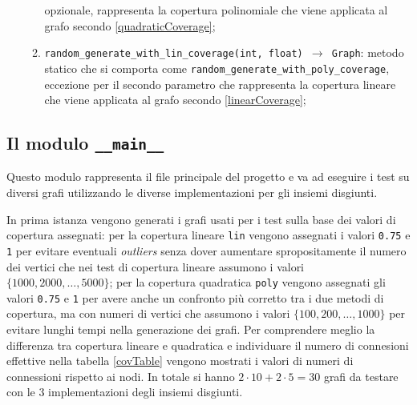 \begin{enumerate}
\begin{enumerate}[resume]
                        opzionale, rappresenta la copertura polinomiale che viene applicata al grafo secondo \eqref{quadraticCoverage};
                  \item \texttt{random\_generate\_with\_lin\_coverage(int, float) $\rightarrow$ Graph}: metodo statico che si comporta come
                        \texttt{random\_generate\_with\_poly\_coverage}, eccezione per il secondo parametro che rappresenta la copertura lineare
                        che viene applicata al grafo secondo \eqref{linearCoverage};
            \end{enumerate}
\end{enumerate}

\subsection{Il modulo \texttt{\_\_main\_\_}}
Questo modulo rappresenta il file principale del progetto e va ad eseguire i test su diversi grafi utilizzando
le diverse implementazioni per gli insiemi disgiunti.\newline

In prima istanza vengono generati i grafi usati per i test sulla base dei valori di copertura assegnati: per la copertura lineare \texttt{lin}
vengono assegnati i valori \texttt{0.75} e \texttt{1} per evitare eventuali \textit{outliers} senza dover aumentare spropositamente il numero dei vertici
che nei test di copertura lineare assumono i valori $\{1000, 2000, \ldots, 5000\}$; per la copertura quadratica \texttt{poly} vengono assegnati
gli valori \texttt{0.75} e \texttt{1} per avere anche un confronto più corretto tra i due metodi di copertura, ma con numeri di vertici che
assumono i valori $\{100, 200, \ldots, 1000\}$ per evitare lunghi tempi nella generazione dei grafi. Per comprendere meglio la differenza tra copertura
lineare e quadratica e individuare il numero di connesioni effettive nella tabella \ref{covTable} vengono mostrati i valori di numeri di connessioni
rispetto ai nodi. In totale si hanno $2 \cdot 10 + 2 \cdot 5 = 30$ grafi da testare con le 3 implementazioni degli insiemi disgiunti.\newline

